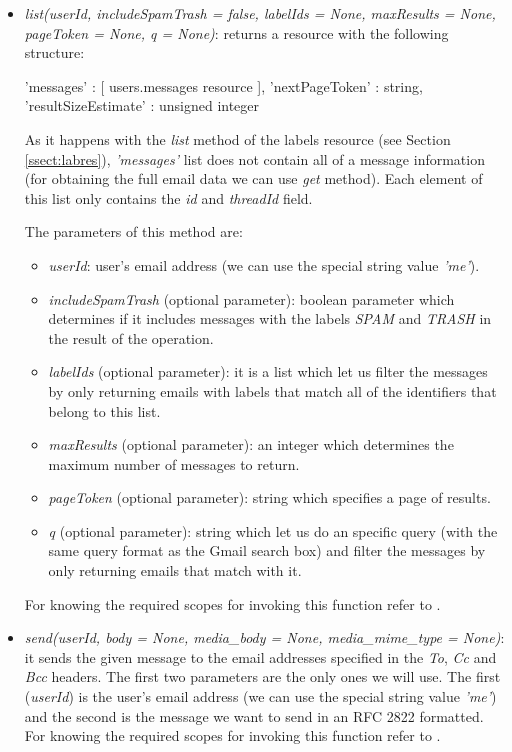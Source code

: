 \begin{itemize}
	\item\textit{list(userId, includeSpamTrash = false, labelIds = None, maxResults = None, pageToken = None, q = None)}: returns a resource with the following structure:
	\begin{python}
		{
		'messages' : [ users.messages resource ],
		'nextPageToken' : string,
		'resultSizeEstimate' : unsigned integer
		}
	\end{python}
	As it happens with the \textit{list} method of the labels resource (see Section \ref{ssect:labres}), \textit{'messages'} list does not contain all of a message information (for obtaining the full email data we can use \textit{get} method). Each element of this list only contains the \textit{id} and \textit{threadId} field.
	
	The parameters of this method are:
	\begin{itemize}
		\item\textit{userId}: user's email address (we can use the special string value \textit{'me'}).
		\item\textit{includeSpamTrash} (optional parameter): boolean parameter which determines if it includes messages with the labels \textit{SPAM} and \textit{TRASH} in the result of the operation.
		\item\textit{labelIds} (optional parameter): it is a list which let us filter the messages by only returning emails with labels that match all of the identifiers that belong to this list.
		\item\textit{maxResults} (optional parameter): an integer which determines the maximum number of messages to return.
		\item\textit{pageToken} (optional parameter): string which specifies a page of results.
		\item\textit{q} (optional parameter): string which let us do an specific query (with the same query format as the Gmail search box) and filter the messages by only returning emails that match with it.
	\end{itemize}
	For knowing the required scopes for invoking this function refer to \cite[/v1/reference/users/messages/list]{gmailAPI}.
	\item\textit{send(userId, body = None, media\_body = None, media\_mime\_type = None)}: it sends the given message to the email addresses specified in the \textit{To}, \textit{Cc} and \textit{Bcc} headers. The first two parameters are the only ones we will use. The first (\textit{userId}) is the user's email address (we can use the special string value \textit{'me'}) and the second is the message we want to send in an RFC 2822 \citep{rfc2822} formatted. For knowing the required scopes for invoking this function refer to \cite[/v1/reference/users/messages/send]{gmailAPI}.
\end{itemize}

